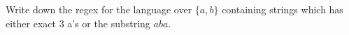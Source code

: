  Write down the regex for the language over $\{a,b\}$ containing strings
  which has either exact 3 a's or the substring $aba$.
